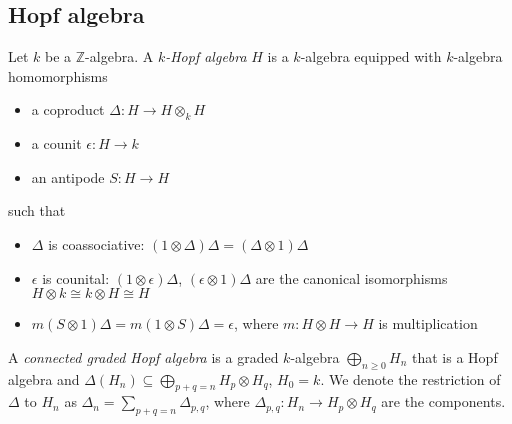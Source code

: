 \subsection{Hopf algebra}

\begin{definition}
Let $k$ be a $\mathbb Z$-algebra. A \textit{$k$-Hopf algebra} $H$ is a $k$-algebra equipped with $k$-algebra homomorphisms
\begin{itemize}
\item a coproduct $\Delta:H\to H\otimes_kH$
\item a counit $\epsilon:H\to k$
\item an antipode $S:H\to H$
\end{itemize}
such that
\begin{itemize}
\item $\Delta$ is coassociative: $(1\otimes\Delta)\Delta=(\Delta\otimes1)\Delta$
\item $\epsilon$ is counital: $(1\otimes\epsilon)\Delta$, $(\epsilon\otimes1)\Delta$ are the canonical isomorphisms $H\otimes k\cong k\otimes H\cong H$
\item $m(S\otimes1)\Delta=m(1\otimes S)\Delta=\epsilon$, where $m:H\otimes H\to H$ is multiplication
\end{itemize}
\end{definition}

\begin{definition}
A \textit{connected graded Hopf algebra} is a graded $k$-algebra $\bigoplus\limits_{n\geq0} H_n$ that is a Hopf algebra and $\Delta(H_n)\subseteq\bigoplus\limits_{p+q=n}H_p\otimes H_q$, $H_0=k$. We denote the restriction of $\Delta$ to $H_n$ as $\Delta_n=\sum\limits_{p+q=n}\Delta_{p,q}$, where $\Delta_{p,q}:H_n\to H_p\otimes H_q$ are the components.
\end{definition}

